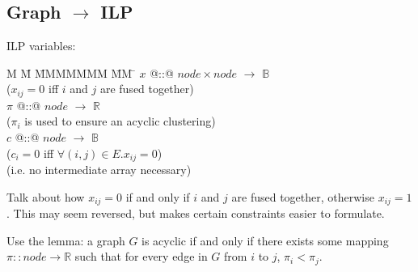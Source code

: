 \subsection{Graph $\to$ ILP}

ILP variables:
\begin{tabbing}
M   \= M \= MMMMMMM \= MM \= \kill
$x$   \> @::@  \> $node \times node$ \> $\to$ \> $\mathbb{B}$ \\
      \>       \> ($x_{ij} = 0$ iff $i$ and $j$ are fused together) \\
$\pi$ \> @::@  \> $node$             \> $\to$ \> $\mathbb{R}$ \\
      \>       \> ($\pi_i$ is used to ensure an acyclic clustering) \\
$c$   \> @::@  \> $node$             \> $\to$ \> $\mathbb{B}$ \\
      \>       \> ($c_i = 0$ iff $\forall (i,j) \in E. x_{ij} = 0$) \\
      \>       \> (i.e. no intermediate array necessary)            \\
\end{tabbing}

Talk about how $x_{ij} = 0$ if and only if $i$ and $j$ are fused together, otherwise $x_{ij} = 1$. This may seem reversed, but makes certain constraints easier to formulate.

Use the lemma:
a graph $G$ is acyclic if and only if there exists some mapping $\pi :: node \to \mathbb{R}$ such that for every edge in $G$ from $i$ to $j$, $\pi_i < \pi_j$.



